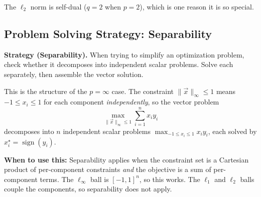 \documentclass[10pt, twocolumn]{article}
\theoremstyle{definition}
\theoremstyle{plain}
\DeclareMathOperator{\sign}{sign}
\begin{document}
The $\ell_2$ norm is self-dual ($q = 2$ when $p = 2$), which is one reason it is so special.

\subsection{Problem Solving Strategy: Separability}

\begin{tcolorbox}
\textbf{Strategy (Separability).} When trying to simplify an optimization problem, check whether it decomposes into independent scalar problems. Solve each separately, then assemble the vector solution.
\end{tcolorbox}

This is the structure of the $p = \infty$ case. The constraint $\|\vec{x}\|_\infty \le 1$ means $-1 \le x_i \le 1$ for each component \emph{independently}, so the vector problem
\[
    \max_{\|\vec{x}\|_\infty \le 1} \sum_{i=1}^{n} x_i y_i
\]
decomposes into $n$ independent scalar problems $\max_{-1 \le x_i \le 1} x_i y_i$, each solved by $x_i^\star = \sign(y_i)$.

\begin{tcolorbox}[colframe=black!50]
\textbf{When to use this:} Separability applies when the constraint set is a Cartesian product of per-component constraints \emph{and} the objective is a sum of per-component terms. The $\ell_\infty$ ball is $[-1,1]^n$, so this works. The $\ell_1$ and $\ell_2$ balls couple the components, so separability does not apply.
\end{tcolorbox}

\begin{center}
\end{center}
\end{document}
